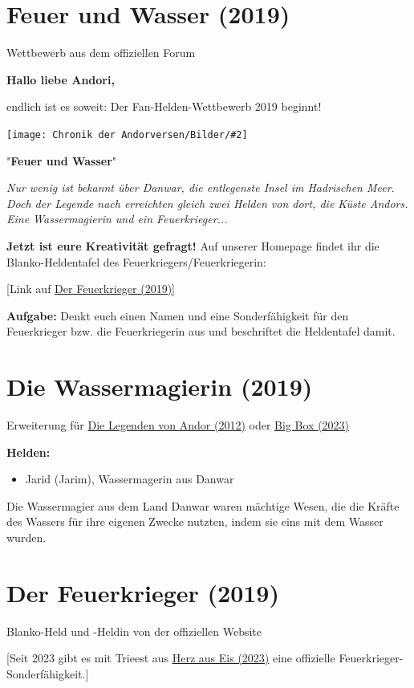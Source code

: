 \documentclass[10pt, a4paper, oneside]{book}
\newcommand{\fillbreak}{\vspace*{\fill}\columnbreak}
\newcommand{\produkt}[1]{%
    \section{#1}%
    \label{Produkt: #1}%
}
\newcommand{\refprodukt}[1]{\hyperref[Produkt: #1]{#1}}
\newcommand{\bildmitts}[2][height=0.32\textwidth,width=0.48\textwidth,keepaspectratio]{%
    \begin{center}
        \texttt{[image: Chronik der Andorversen/Bilder/\#2]}
    \end{center}
}
\begin{document}
\begin{multicols}{2}
\fillbreak
\produkt{Feuer und Wasser (2019)}

\begin{center}
    Wettbewerb aus dem offiziellen Forum
\end{center}

\textbf{Hallo liebe Andori,}

endlich ist es soweit: Der Fan-Helden-Wettbewerb 2019 beginnt!

\bildmitts{Feuer und Wasser.jpeg}

"\textbf{Feuer und Wasser}"

\textit{Nur wenig ist bekannt über Danwar, die entlegenste Insel im Hadrischen Meer. Doch der Legende nach erreichten gleich zwei Helden von dort, die Küste Andors. Eine Wassermagierin und ein Feuerkrieger...}

\textbf{Jetzt ist eure Kreativität gefragt!}
Auf unserer Homepage findet ihr die Blanko-Heldentafel des Feuerkriegers/Feuerkriegerin:

[Link auf \refprodukt{Der Feuerkrieger (2019)}]

\textbf{Aufgabe:}
Denkt euch einen Namen und eine Sonderfähigkeit für den Feuerkrieger bzw. die Feuerkriegerin aus und beschriftet die Heldentafel damit.




\produkt{Die Wassermagierin (2019)}

\begin{center}
    Erweiterung für \refprodukt{Die Legenden von Andor (2012)} oder \refprodukt{Big Box (2023)}
\end{center}

\textbf{Helden:} 
\begin{itemize}[topsep=0pt,itemsep=-1ex,partopsep=1ex,parsep=1ex]
    \item Jarid (Jarim), Wassermagerin aus Danwar\bigskip
\end{itemize}

Die Wassermagier aus dem Land Danwar waren mächtige Wesen, die
die Kräfte des Wassers für ihre eigenen Zwecke nutzten, indem sie eins
mit dem Wasser wurden.





\produkt{Der Feuerkrieger (2019)}

\begin{center}
    Blanko-Held und -Heldin von der offiziellen Website
\end{center}

[Seit 2023 gibt es mit Trieest aus \refprodukt{Herz aus Eis (2023)} eine offizielle Feuerkrieger-Sonderfähigkeit.]





\end{multicols}
\end{document}
